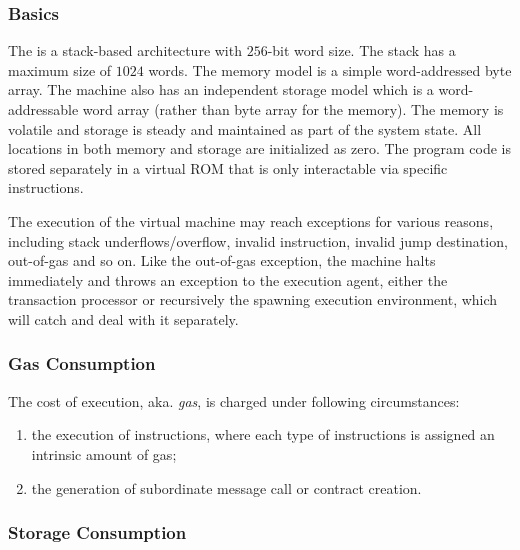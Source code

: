 \subsubsection{Basics}

The \cvm is a stack-based architecture with $256$-bit word size.
The stack has a maximum size of $1024$ words.
The memory model is a simple word-addressed byte array.  
The machine also has an independent storage model which is a word-addressable word array (rather than byte array for the memory). 
The memory is volatile and storage is steady and maintained as part of the system state. 
All locations in both memory and storage are initialized as zero.
The program code is stored separately in a virtual ROM that is only interactable via specific instructions.

The execution of the virtual machine may reach exceptions for various reasons, including stack underflows/overflow, invalid instruction, invalid jump destination, out-of-gas and so on.
Like the out-of-gas exception, the machine halts immediately and throws an exception to the execution agent, either the transaction processor or recursively the spawning execution environment, which will catch and deal with it separately. 



\subsubsection{Gas Consumption}

The cost of execution, aka. \emph{gas}, is charged under following circumstances:
\begin{enumerate}[nosep]
	\item the execution of instructions, where each type of instructions is assigned an intrinsic amount of gas;

	\item the generation of subordinate message call or contract creation.

\end{enumerate}


\subsubsection{Storage Consumption}
	\label{subsec:storage consumption}

